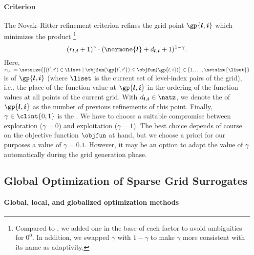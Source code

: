
\paragraph{Criterion}

The Novak--Ritter refinement criterion \cite{Novak96Global}
refines the grid point $\gp{\*l,\*i}$ which minimizes the product%
\footnote{%
  Compared to \cite{Novak96Global},
  we added one in the base of each factor to avoid ambiguities
  for $0^0$.
  In addition, we swapped $\gamma$ with $1-\gamma$
  to make $\gamma$ more consistent with its name as adaptivity.%
}
\begin{equation}
  (r_{\*l,\*i} + 1)^\gamma \cdot
  (\normone{\*l} + d_{\*l,\*i} + 1)^{1 - \gamma}.
\end{equation}
Here, $r_{\*l,\*i} := \setsize{
  \{(\*l',\*i') \in \liset \mid
  \objfun(\gp{\*l',\*i'}) \le \objfun(\gp{\*l,\*i})
} \in \{1, \dotsc, \setsize{\liset}\}$ is  of $\gp{\*l,\*i}$
(where $\liset$ is the current set of level-index pairs of the grid), i.e.,
the place of the function value at $\gp{\*l,\*i}$
in the ordering of the function values at all points of the current grid.
With $d_{\*l,\*i} \in \natz$, we denote the  of $\gp{\*l,\*i}$
as the number of previous refinements of this point.
Finally, $\gamma \in \clint{0, 1}$ is the .
We have to choose a suitable compromise between exploration ($\gamma = 0$)
and exploitation ($\gamma = 1$).
The best choice depends of course on the objective function $\objfun$ at hand,
but we choose a priori for our purposes a value of $\gamma = 0.1$.
However, it may be an option to adapt the value of $\gamma$ automatically
during the grid generation phase.



\subsection{Global Optimization of Sparse Grid Surrogates}
\label{sec:522method}

\paragraph{Global, local, and globalized optimization methods}

